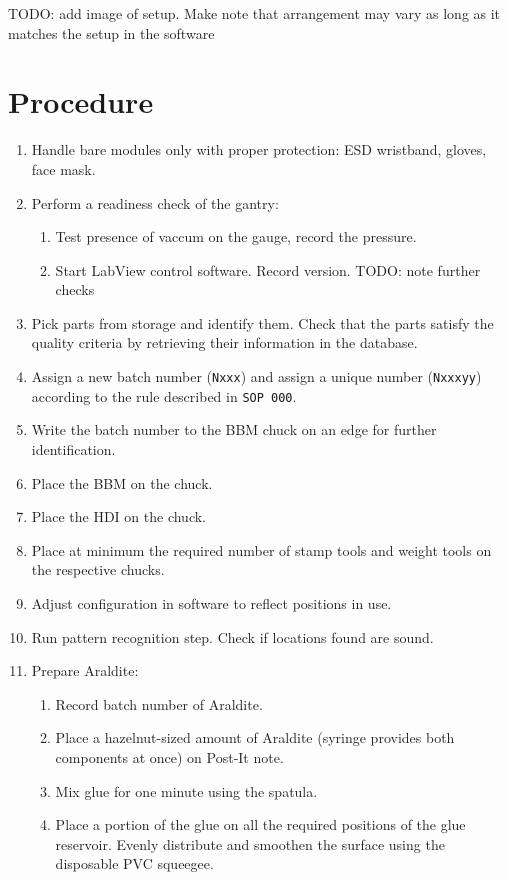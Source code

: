 \documentclass[12pt]{unlsilabsop}
\begin{document}
TODO: add image of setup. Make note that arrangement may vary as long as it matches the setup in the software

\section{Procedure}

\begin{enumerate}
    \item Handle bare modules only with proper protection: ESD wristband, gloves, face mask.
    \item Perform a readiness check of the gantry:
    \begin{enumerate}
	\item Test presence of vaccum on the gauge, record the pressure.
	\item Start LabView control software. Record version. TODO: note further checks
    \end{enumerate}
    \item Pick parts from storage and identify them. Check that the parts satisfy the quality criteria by retrieving their information in the database.
    \item Assign a new batch number (\texttt{Nxxx}) and assign a unique number (\texttt{Nxxxyy}) according to the rule described in \texttt{SOP~000}.
    \item Write the batch number to the BBM chuck on an edge for further identification.
    \item Place the BBM on the chuck.
    \item Place the HDI on the chuck.
    \item Place at minimum the required number of stamp tools and weight tools on the respective chucks.
    \item Adjust configuration in software to reflect positions in use.
    \item Run pattern recognition step. Check if locations found are sound.
    \item Prepare Araldite:
    \begin{enumerate}
	\item Record batch number of Araldite.
	\item Place a hazelnut-sized amount of Araldite (syringe provides both components at once) on Post-It note.
	\item Mix glue for one minute using the spatula.
	\item Place a portion of the glue on all the required positions of the glue reservoir. Evenly distribute and smoothen the surface using the disposable PVC squeegee.

\end{enumerate}
\end{enumerate}
\end{document}
